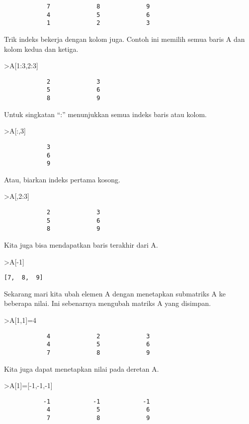 \documentclass[
]{book}
\begin{document}
\begin{verbatim}
            7             8             9 
            4             5             6 
            1             2             3 
\end{verbatim}

Trik indeks bekerja dengan kolom juga. Contoh ini memilih semua baris A dan kolom kedua dan ketiga.

\textgreater A{[}1:3,2:3{]}

\begin{verbatim}
            2             3 
            5             6 
            8             9 
\end{verbatim}

Untuk singkatan ``:'' menunjukkan semua indeks baris atau kolom.

\textgreater A{[}:,3{]}

\begin{verbatim}
            3 
            6 
            9 
\end{verbatim}

Atau, biarkan indeks pertama kosong.

\textgreater A{[},2:3{]}

\begin{verbatim}
            2             3 
            5             6 
            8             9 
\end{verbatim}

Kita juga bisa mendapatkan baris terakhir dari A.

\textgreater A{[}-1{]}

\begin{verbatim}
[7,  8,  9]
\end{verbatim}

Sekarang mari kita ubah elemen A dengan menetapkan submatriks A ke beberapa nilai. Ini sebenarnya mengubah matriks A yang disimpan.

\textgreater A{[}1,1{]}=4

\begin{verbatim}
            4             2             3 
            4             5             6 
            7             8             9 
\end{verbatim}

Kita juga dapat menetapkan nilai pada deretan A.

\textgreater A{[}1{]}={[}-1,-1,-1{]}

\begin{verbatim}
           -1            -1            -1 
            4             5             6 
            7             8             9 
\end{verbatim}
\end{document}
